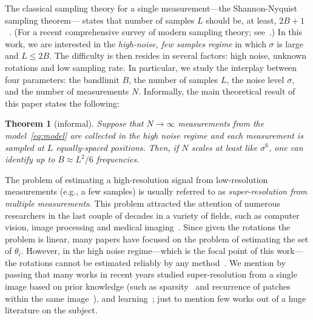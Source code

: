 \documentclass[english,12pt]{article}
\newcommand{\tB}{B}
\newtheorem{thm}{Theorem}
\numberwithin{equation}{section}
\numberwithin{thm}{section} %
\begin{document}
The classical sampling theory for a single measurement---the Shannon-Nyquist sampling theorem--- states that number of samples $L$ should be, at least, $2\tB+1$~\cite{shannon1949communication}. (For a recent comprehensive survey of modern sampling theory; see~\cite{eldar2015sampling}.)
In this work, we are interested in  the \emph{high-noise, few samples regime}  in which $\sigma$ is large  and $L\leq 2\tB$. 
The difficulty is then resides in several factors: high noise, unknown rotations and low sampling rate.
In particular, we study the interplay between four parameters: the bandlimit $\tB$, the number of samples $L$, the noise level $\sigma$, and the number of measurements $N$. %
Informally, the main theoretical result of this paper states the following:
\begin{thm}[informal]
Suppose that $N\to\infty$ measurements from the model~\eqref{eq:model} are collected in the high noise regime and each measurement is sampled at $L$ equally-spaced positions. 
Then, if $N$ scales at least like $\sigma^6$, one can identify up to $B\approx L^2/6$ frequencies. %
\end{thm}

The problem of estimating a high-resolution signal from low-resolution measurements (e.g., a few samples) is usually referred to as \emph{super-resolution from multiple measurements}. This problem attracted the attention of numerous researchers  in the last couple of decades in a variety of fields, such as computer vision, image processing and medical imaging~\cite{park2003super,farsiu2004advances, greenspan2008super}.
Since given the rotations the problem is linear, many papers have focused on the problem of estimating the set of $\theta_i$. However, in the high noise regime---which is the focal point of this work---the rotations cannot be estimated reliably by any method~\cite{bendory2018toward,aguerrebere2016fundamental}. 
We mention by passing that many works in recent years studied super-resolution from a single image based on prior knowledge (such as sparsity~\cite{huang2009super,candes2014towards} and recurrence of patches within the same image~\cite{glasner2009super}),
and learning~\cite{lim2017enhanced}; just to mention few works out of a huge literature on the subject. 
\end{document}
